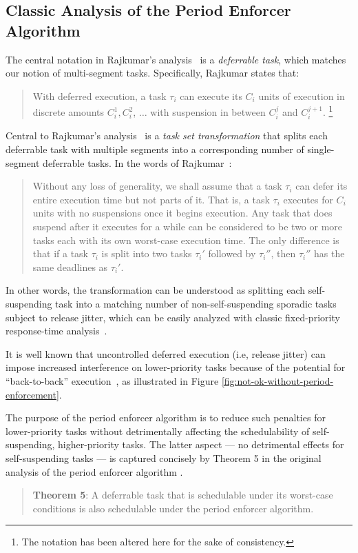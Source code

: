 \subsection{Classic Analysis of the Period Enforcer Algorithm}
\label{sec:classic-analysis}

The central notation in Rajkumar's analysis~\cite{Raj:suspension1991} is a \emph{deferrable task}, which matches our notion of multi-segment tasks.  Specifically, Rajkumar states that:
\begin{quote}
With deferred execution, a task $\tau_i$ can execute its $C_i$ units of execution in discrete amounts $C_i^1, C_i^2$, $\ldots$ with suspension in between $C_i^j$ and $C_i^{j+1}$. \cite[Section 3]{Raj:suspension1991}\footnote{The notation has been altered here for the sake of consistency.} 
\end{quote}
%
Central to Rajkumar's analysis~\cite{Raj:suspension1991} is a \emph{task set transformation} that splits each deferrable task with multiple segments into a corresponding number of single-segment deferrable tasks.  In the words of Rajkumar~\cite[Section 3]{Raj:suspension1991}:

\begin{quote}
	 Without any loss of generality, we shall assume that a task $\tau_i$ can defer its entire execution time but not parts of it. That is, a task $\tau_i$ executes for $C_i$ units with no suspensions once it begins execution. Any task that does suspend after it executes for a while can be considered to be two or more tasks each with its own worst-case execution time. The only difference is that if a task $\tau_i$ is split into two tasks $\tau_i'$ followed by $\tau_i''$, then $\tau_i''$ has the same deadlines as $\tau_i{{'}}$. 
\end{quote}
%
In other words, the transformation can be understood as splitting each self-suspending task into a matching number of non-self-suspending sporadic tasks subject to release jitter, which can be easily analyzed with classic fixed-priority response-time analysis~\cite{ABRTW:93}.

It is well known that uncontrolled deferred execution (i.e, release jitter) can impose  increased interference on lower-priority tasks because of the potential for ``back-to-back'' execution~\cite{LSS:87,LSST:91,Ra:90,ABRTW:93,SLS:95}, as illustrated in Figure \ref{fig:not-ok-without-period-enforcement}. 

The purpose of the period enforcer algorithm is to reduce such penalties for lower-priority tasks without detrimentally affecting the schedulability of self-suspending, higher-priority tasks. The latter aspect --- no detrimental effects for self-suspending tasks --- is captured concisely by Theorem 5 in the original analysis of the period enforcer algorithm \cite{Raj:suspension1991}.
\begin{quote}
{\bf Theorem 5}: A deferrable task that is schedulable under its worst-case conditions is also schedulable under the period enforcer algorithm.  \cite{Raj:suspension1991}
\end{quote}

